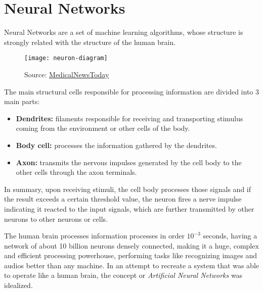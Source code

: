 \section{Neural Networks}\label{sec:nn}
Neural Networks are a set of machine learning algorithms, whose structure is strongly related with the structure of the human brain. 
\begin{figure}[H]
    \texttt{[image: neuron-diagram]}
    \caption{Source: \href{https://www.medicalnewstoday.com/articles/320289}{MedicalNewsToday}}
\end{figure}
The main structural cells responsible for processing information are divided into 3 main parts:
\begin{itemize}
    \item \textbf{Dendrites:} filaments responsible for receiving and transporting stimulus coming from the environment or other cells of the body.
    \item \textbf{Body cell:} processes the information gathered by the dendrites.
    \item \textbf{Axon:} transmits the nervous impulses generated by the cell body to the other cells through the axon terminals.
\end{itemize}
In summary, upon receiving stimuli, the cell body processes those signals and if the result exceeds a certain threshold value, the neuron fires a nerve impulse indicating it reacted to the input signals, which are further transmitted by other neurons to other neurons or cells.

The human brain processes information processes in order $10^{-3}$ seconds, having a network of about 10 billion neurons densely connected, making it a huge, complex and efficient processing powerhouse, performing tasks like recognizing images and audios better than any machine. In an attempt to recreate a system that was able to operate like a human brain, the concept or \textit{Artificial Neural Networks} was idealized.

